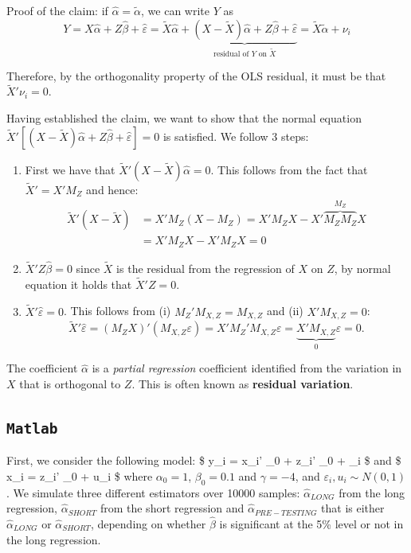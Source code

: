 \documentclass[12pt,]{book}
\begin{document}
Proof of the claim: if \(\hat{\alpha} = \tilde{\alpha}\), we can write \(Y\) as
\[
    Y =  X \hat{\alpha} + Z \hat{\beta} + \hat{\varepsilon}  = \tilde{X} \hat{\alpha} + \underbrace{(X - \tilde{X}) \hat{\alpha } + Z \hat{\beta} + \hat{\varepsilon}}_\text{residual of $Y$ on $\tilde{X} $} = \tilde{X} \tilde{\alpha} + \nu_i
\]

Therefore, by the orthogonality property of the OLS residual, it must be that \(\tilde{X}'\nu_i= 0\).
\[\tag*{$\blacksquare$}\]

Having established the claim, we want to show that the normal equation \(\tilde{X}' \left[ (X - \tilde{X})\hat{\alpha} + Z \hat{\beta} +\hat{\varepsilon} \right] = 0\) is satisfied. We follow 3 steps:

\begin{enumerate}
\def\labelenumi{\arabic{enumi}.}
\item
  First we have that \(\tilde{X}' (X - \tilde{X})\hat{\alpha} = 0\). This follows from the fact that \(\tilde{X}' = X' M_Z\) and hence:
  \[
    \begin{aligned}
    \tilde{X}' (X - \tilde{X})  &  = X' M_Z (X - M_Z) = X' M_Z X - X' \overbrace{M_Z M_Z}^{M_Z} X \\ & = X'M_Z X - X' M_Z X = 0
    \end{aligned}
  \]
\item
  \(\tilde{X}' Z \hat{\beta} = 0\) since \(\tilde{X}\) is the residual from the regression of \(X\) on \(Z\), by normal equation it holds that \(\tilde{X}' Z = 0\).
\item
  \(\tilde{X}' \hat{\varepsilon} = 0\). This follows from (i) \(M_Z ' M_{X, Z} = M_{X,Z}\) and (ii) \(X' M_{X, Z} = 0\):
  \[
    \tilde{X}' \hat{\varepsilon} = (M_Z X)' (M_{X, Z} \varepsilon)  = X'M_Z' M_{X, Z} \varepsilon = \underbrace{X' M_{X, Z}}_0 \varepsilon = 0.
  \]
  \[\tag*{$\blacksquare$}\]
\end{enumerate}

The coefficient \(\hat{\alpha}\) is a \emph{partial regression} coefficient identified from the variation in \(X\) that is orthogonal to \(Z\). This is often known as \textbf{residual variation}.

\hypertarget{matlab-8}{%
\subsection{\texorpdfstring{\texttt{Matlab}}{Matlab}}\label{matlab-8}}

First, we consider the following model: \$ y\_i = x\_i' \alpha\_0 + z\_i' \beta\_0 + \varepsilon\_i \$ and
\$ x\_i = z\_i' \gamma\_0 + u\_i \$ where \(\alpha_0 = 1\), \(\beta_0 = 0.1\) and \(\gamma = -4\), and \(\varepsilon_i, u_i \sim N(0,1)\). We simulate three different estimators over 10000 samples: \(\hat \alpha_{LONG}\) from the long regression, \(\hat \alpha_{SHORT}\) from the short regression and \(\hat \alpha_{PRE-TESTING}\) that is either \(\hat \alpha_{LONG}\) or \(\hat \alpha_{SHORT}\), depending on whether \(\hat \beta\) is significant at the 5\% level or not in the long regression.
\end{document}
